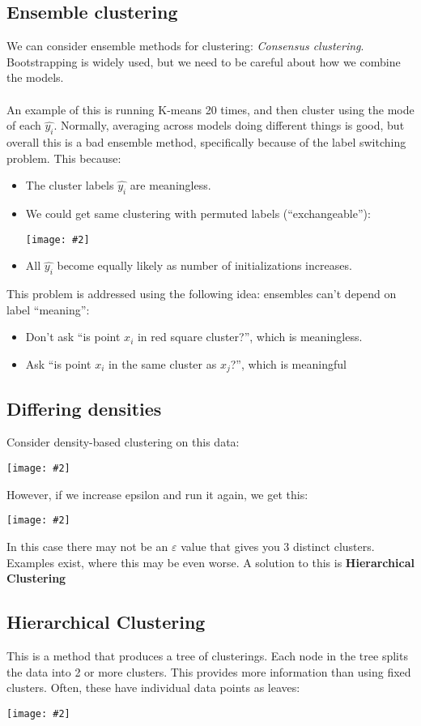 \documentclass{article}
\def\blu#1{{\color{blu}#1}}
\def\gre#1{{\color{gre}#1}}
\def\red#1{{\color{red}#1}}
\theoremstyle{definition}
\newcommand{\centerfig}[2]{\begin{center}\texttt{[image: \#2]}\end{center}}
\begin{document}
\subsection*{Ensemble clustering}
We can consider \blu{ensemble methods} for clustering: \textit{Consensus clustering}. \blu{Bootstrapping} is widely used, but we \red{need to be careful} about how we combine the models. \\ \\
An example of this is running K-means 20 times, and then cluster using the mode of each $ \hat{y_i} $. Normally, averaging across models doing different things is good, but overall this is a bad ensemble method, specifically because of the label switching problem. This because:
\begin{itemize}
	\item The \blu{cluster labels $\hat{y_i}$ are meaningless}. 
	\item We could get \gre{same clustering with permuted labels} (“exchangeable”):
	\centerfig{0.75}{Pic5}
	\item All $\hat{y_i}$ \gre{become equally likely} as number of initializations increases.
\end{itemize}
This problem is addressed using the following idea: ensembles can’t depend on label “meaning”:
\begin{itemize}
	\item Don’t ask “\red{is point $ x_i $ in red square cluster?}”, which is meaningless.
	\item Ask “\gre{is point $ x_i $ in the same cluster as $ x_j $?}”, which is meaningful
\end{itemize}

\subsection*{Differing densities}
Consider density-based clustering on this data:
\centerfig{0.5}{Pic6}
However, if we \gre{increase epsilon} and run it again, we get this:
\centerfig{0.75}{Pic7}
In this case there may not be an $\varepsilon$ value that gives you 3 distinct clusters. Examples exist, where this may be even worse. A solution to this is \textbf{Hierarchical Clustering}

\subsection*{Hierarchical Clustering}
This is a method that produces a \gre{tree of clusterings}. Each node in the tree splits the data into 2 or more clusters. This provides more information than using fixed clusters. Often, these have individual data points as leaves:
\centerfig{0.8}{Pic8}
\end{document}
